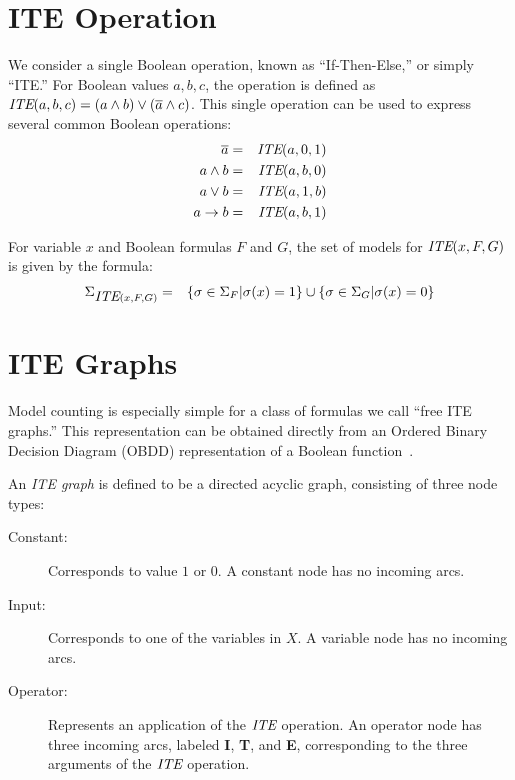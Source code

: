 \documentclass{llncs}
\newcommand{\tautology}{1}
\newcommand{\nil}{0}
\newcommand{\obar}[1]{\overline{#1}}
\newcommand{\ite}{\mbox{\it ITE}}
\newcommand{\interp}{\sigma}
\newcommand{\interpset}[1]{\Sigma_{#1}}
\newcommand{\ifarg}{\textbf{I}}
\newcommand{\thenarg}{\textbf{T}}
\newcommand{\elsearg}{\textbf{E}}
\begin{document}
\section{ITE Operation}

We consider a single Boolean operation, known as
``If-Then-Else,'' or simply ``ITE.''  For Boolean values $a, b, c$,
the operation is defined as $\ite(a,b,c) = (a \land b) \lor (\obar{a}
\land c)$.  This single operation can be used to express several common Boolean operations:
\begin{eqnarray*}
\obar{a} & = & \ite(a, \nil, \tautology) \\
a \land b & = & \ite(a, b, \nil) \\
a \lor b & = & \ite(a, \tautology, b) \\
a \rightarrow b & = & \ite(a, b, \tautology) \\
\end{eqnarray*}  

For variable $x$ and Boolean formulas $F$ and $G$, the set of models
for $\ite(x, F, G)$ is given by the formula:
\begin{eqnarray}
  \interpset{\ite(x, F, G)} & = & \{ \interp \in \interpset{F} | \interp(x) = \tautology \}
  \cup \{ \interp \in \interpset{G} | \interp(x) = \nil \} \label{eqn:ite:interp}
\end{eqnarray}

\section{ITE Graphs}
Model counting is especially simple for a class of formulas we
call ``free ITE graphs.''  This representation can be obtained
directly from an Ordered Binary Decision Diagram (OBDD) representation
of a Boolean function~\cite{Bryant:1986}.

An {\em ITE graph} is defined to be a directed acyclic graph,
consisting of three node types:
\begin{description}
\item[Constant:] Corresponds to value $\tautology$ or $\nil$.  A constant node has no incoming arcs.
\item[Input:] Corresponds to one of the variables in $X$.   A variable node has no incoming arcs.
\item[Operator:] Represents an application of the $\ite$ operation.  An operator node has three incoming arcs, labeled \ifarg{}, \thenarg{}, and \elsearg{}, corresponding to the three arguments of the $\ite$ operation.
\end{description}  
\end{document}
